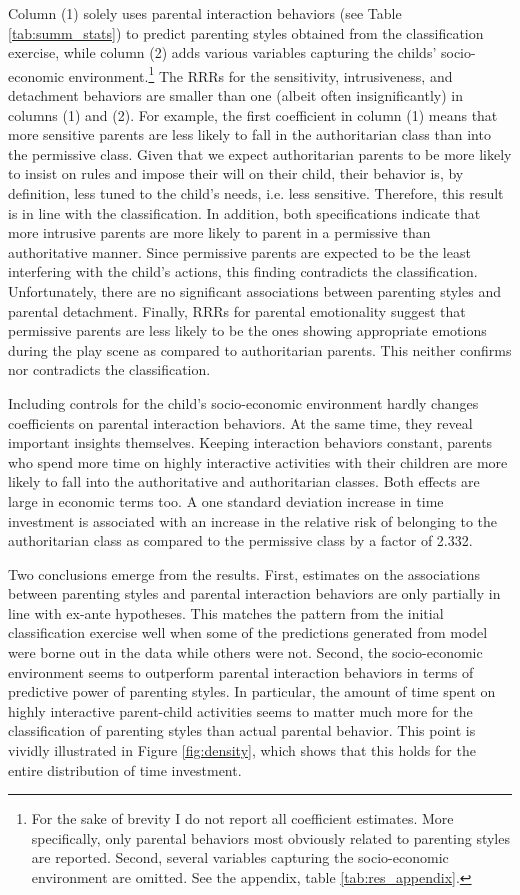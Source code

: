 %
Column (1) solely uses parental interaction behaviors (see Table \ref{tab:summ_stats}) to predict parenting styles obtained from the classification exercise, while column (2) adds various variables capturing the childs' socio-economic environment.\footnote{
For the sake of brevity I do not report all coefficient estimates. More specifically, only parental behaviors most obviously related to parenting styles are reported. Second, several variables capturing the socio-economic environment are omitted. See the appendix, table \ref{tab:res_appendix}.
} 
The RRRs for the sensitivity, intrusiveness, and detachment behaviors are smaller than one (albeit often insignificantly) in columns (1) and (2). For example, the first coefficient in column (1) means that more sensitive parents are less likely to fall in the authoritarian class than into the permissive class. Given that we expect authoritarian parents to be more likely to insist on rules and impose their will on their child, their behavior is, by definition, less tuned to the child's needs, i.e. less sensitive. Therefore, this result is in line with the classification.
%
In addition, both specifications indicate that more intrusive parents are more likely to parent in a permissive than authoritative manner. Since permissive parents are expected to be the least interfering with the child's actions, this finding contradicts the classification. Unfortunately, there are no significant associations between parenting styles and parental detachment. Finally, RRRs for parental emotionality suggest that permissive parents are less likely to be the ones showing appropriate emotions during the play scene as compared to authoritarian parents. This neither confirms nor contradicts the classification.

Including controls for the child's socio-economic environment hardly changes coefficients on parental interaction behaviors. At the same time, they reveal important insights themselves. Keeping interaction behaviors constant, parents who spend more time on highly interactive activities with their children are more likely to fall into the authoritative and authoritarian classes. Both effects are large in economic terms too. A one standard deviation increase in time investment is associated with an increase in the relative risk of belonging to the authoritarian class as compared to the permissive class by a factor of 2.332.

Two conclusions emerge from the results. First, estimates on the associations between parenting styles and parental interaction behaviors are only partially in line with ex-ante hypotheses. This matches the pattern from the initial classification exercise well when some of the predictions generated from model were borne out in the data while others were not. Second, the socio-economic environment seems to outperform parental interaction behaviors in terms of predictive power of parenting styles. In particular, the amount of time spent on highly interactive parent-child activities seems to matter much more for the classification of parenting styles than actual parental behavior. This point is vividly illustrated in Figure \ref{fig:density}, which shows that this holds for the entire distribution of time investment.

